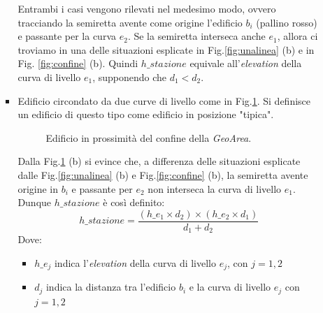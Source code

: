 \begin{enumerate}
\begin{enumerate}
\begin{itemize}
Entrambi i casi vengono rilevati nel medesimo modo, ovvero tracciando la semiretta avente come origine l'edificio $b_i$ (pallino rosso) e passante per la curva $e_2$. Se la semiretta interseca anche $e_1$, allora ci troviamo in una delle situazioni esplicate in Fig.\ref{fig:unalinea} (b) e in Fig. \ref{fig:confine} (b). Quindi $h\_stazione$ equivale all'\textit{elevation} della curva di livello $e_1$, supponendo che $d_1 < d_2$.

\newpage

\item Edificio circondato da due curve di livello come in Fig.\ref{fig:circondata}. Si definisce un edificio di questo tipo come edificio in posizione "tipica".

\begin{figure}[bth]
\myfloatalign
{} \quad
{} 
\caption[]{Edificio in prossimità del confine della \textit{GeoArea}.}\label{fig:circondata}
\end{figure}

Dalla Fig.\ref{fig:circondata} (b) si evince che, a differenza delle situazioni esplicate dalle Fig.\ref{fig:unalinea} (b) e Fig.\ref{fig:confine} (b), la semiretta avente origine in $b_i$ e passante per $e_2$ non interseca la curva di livello $e_1$.
Dunque $h\_stazione$ è così definito:
\begin{equation}
\label{eq:hstazione}
   h\_stazione = \frac{(h\_e_1 \times d_2) \times ( h\_e_2 \times d_1)}{d_1 +d_2}
\end{equation}
Dove:
\begin{itemize}
\item $h\_e_j$ indica l'\textit{elevation} della curva di livello $e_j$, con $j=1,2$
\item $d_j$ indica la distanza tra l'edificio $b_i$ e la curva di livello $e_j$ con $j=1,2$
\end{itemize}


\end{itemize}
\end{enumerate}
\end{enumerate}
